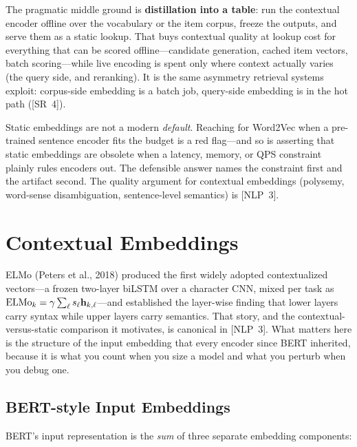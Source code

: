 The pragmatic middle ground is \textbf{distillation into a table}: run the contextual encoder offline over the vocabulary or the item corpus, freeze the outputs, and serve them as a static lookup. That buys contextual quality at lookup cost for everything that can be scored offline---candidate generation, cached item vectors, batch scoring---while live encoding is spent only where context actually varies (the query side, and reranking). It is the same asymmetry retrieval systems exploit: corpus-side embedding is a batch job, query-side embedding is in the hot path ([SR~4]).

\begin{warningbox}
Static embeddings are not a modern \emph{default}. Reaching for Word2Vec when a pre-trained sentence encoder fits the budget is a red flag---and so is asserting that static embeddings are obsolete when a latency, memory, or QPS constraint plainly rules encoders out. The defensible answer names the constraint first and the artifact second. The quality argument for contextual embeddings (polysemy, word-sense disambiguation, sentence-level semantics) is [NLP~3].
\end{warningbox}

\section{Contextual Embeddings}
\label{sec:contextual}

ELMo (Peters et al., 2018) produced the first widely adopted contextualized vectors---a frozen two-layer biLSTM over a character CNN, mixed per task as $\text{ELMo}_k = \gamma \sum_{\ell} s_\ell \mathbf{h}_{k,\ell}$---and established the layer-wise finding that lower layers carry syntax while upper layers carry semantics. That story, and the contextual-versus-static comparison it motivates, is canonical in [NLP~3]. What matters here is the structure of the input embedding that every encoder since BERT inherited, because it is what you count when you size a model and what you perturb when you debug one.

\subsection{BERT-style Input Embeddings}

BERT's input representation is the \emph{sum} of three separate embedding components:

